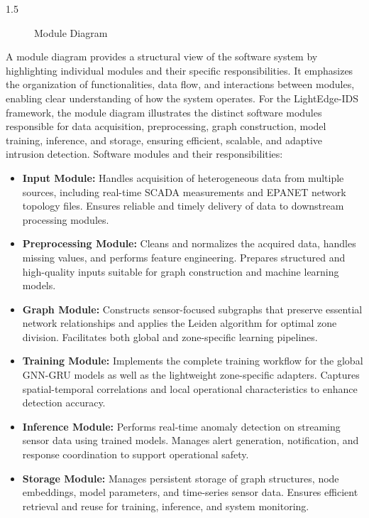 \begin{spacing}{1.5}
\begin{figure}[H]
\begin{tikzpicture}[node distance=1cm, scale=0.75, every node/.style={transform shape}]
\end{tikzpicture}
\caption{Module Diagram}
\end{figure}


A module diagram provides a structural view of the software system by highlighting individual modules and their specific responsibilities. It emphasizes the organization of functionalities, data flow, and interactions between modules, enabling clear understanding of how the system operates. For the LightEdge-IDS framework, the module diagram illustrates the distinct software modules responsible for data acquisition, preprocessing, graph construction, model training, inference, and storage, ensuring efficient, scalable, and adaptive intrusion detection. Software modules and their responsibilities:

\begin{itemize}
    \item \textbf{Input Module:}  
    Handles acquisition of heterogeneous data from multiple sources, including real-time SCADA measurements and EPANET network topology files. Ensures reliable and timely delivery of data to downstream processing modules.

    \item \textbf{Preprocessing Module:}  
    Cleans and normalizes the acquired data, handles missing values, and performs feature engineering. Prepares structured and high-quality inputs suitable for graph construction and machine learning models.

    \item \textbf{Graph Module:}  
    Constructs sensor-focused subgraphs that preserve essential network relationships and applies the Leiden algorithm for optimal zone division. Facilitates both global and zone-specific learning pipelines.

    \item \textbf{Training Module:}  
    Implements the complete training workflow for the global GNN-GRU models as well as the lightweight zone-specific adapters. Captures spatial-temporal correlations and local operational characteristics to enhance detection accuracy.

    \item \textbf{Inference Module:}  
    Performs real-time anomaly detection on streaming sensor data using trained models. Manages alert generation, notification, and response coordination to support operational safety.

    \item \textbf{Storage Module:}  
    Manages persistent storage of graph structures, node embeddings, model parameters, and time-series sensor data. Ensures efficient retrieval and reuse for training, inference, and system monitoring.
\end{itemize}


\end{spacing}
